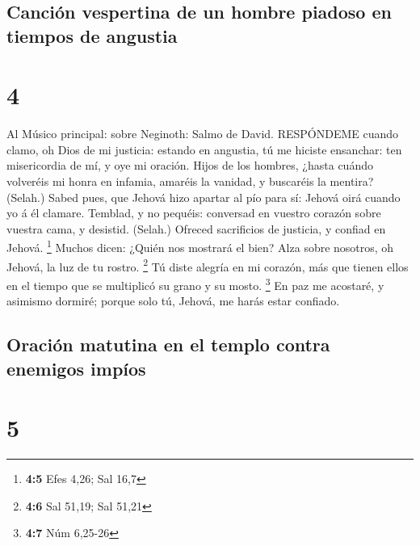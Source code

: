 \hypertarget{canciuxf3n-vespertina-de-un-hombre-piadoso-en-tiempos-de-angustia}{%
\subsection{Canción vespertina de un hombre piadoso en tiempos de
angustia}\label{canciuxf3n-vespertina-de-un-hombre-piadoso-en-tiempos-de-angustia}}

\hypertarget{section-3}{%
\section{4}\label{section-3}}

 Al Músico principal: sobre Neginoth: Salmo de David.
RESPÓNDEME cuando clamo, oh Dios de mi justicia: estando en angustia, tú
me hiciste ensanchar: ten misericordia de mí, y oye mi oración.
 Hijos de los hombres, ¿hasta cuándo volveréis mi honra en
infamia, amaréis la vanidad, y buscaréis la mentira? (Selah.)
 Sabed pues, que Jehová hizo apartar al pío para sí: Jehová
oirá cuando yo á él clamare.  Temblad, y no pequéis:
conversad en vuestro corazón sobre vuestra cama, y desistid. (Selah.)
 Ofreced sacrificios de justicia, y confiad en Jehová.
\footnote{\textbf{4:5} Efes 4,26; Sal 16,7}  Muchos dicen:
¿Quién nos mostrará el bien? Alza sobre nosotros, oh Jehová, la luz de
tu rostro. \footnote{\textbf{4:6} Sal 51,19; Sal 51,21}  Tú
diste alegría en mi corazón, más que tienen ellos en el tiempo que se
multiplicó su grano y su mosto. \footnote{\textbf{4:7} Núm 6,25-26}
 En paz me acostaré, y asimismo dormiré; porque solo tú,
Jehová, me harás estar confiado.

\hypertarget{oraciuxf3n-matutina-en-el-templo-contra-enemigos-impuxedos}{%
\subsection{Oración matutina en el templo contra enemigos
impíos}\label{oraciuxf3n-matutina-en-el-templo-contra-enemigos-impuxedos}}

\hypertarget{section-4}{%
\section{5}\label{section-4}}

